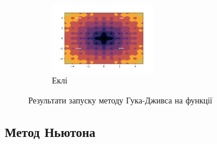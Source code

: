\begin{figure}[h!]
\begin{subfigure}{\textwidth}
        \centering
        \includegraphics[width=0.5\textwidth, trim=1cm 0.5cm 1.3cm 1cm, clip]{assets/HookeJeeves/ackley.pdf}
        \caption{Еклі}
    \end{subfigure}
    \caption{Результати запуску методу Гука-Дживса на функції}
\end{figure}

\subsection*{Метод Ньютона}

